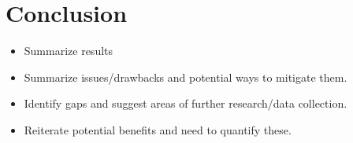 \chapter*{Conclusion}           %
\label{chap-conclusion}         %

\begin{itemize}
	\item Summarize results
	\item Summarize issues/drawbacks and potential ways to mitigate them.
	\item Identify gaps and suggest areas of further research/data collection.
	\item Reiterate potential benefits and need to quantify these.
\end{itemize}